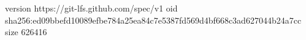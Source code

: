 version https://git-lfs.github.com/spec/v1
oid sha256:ed09bbefd10089efbe784a25ea84c7e5387fd569d4bf668c3ad627044b24a7cc
size 626416
